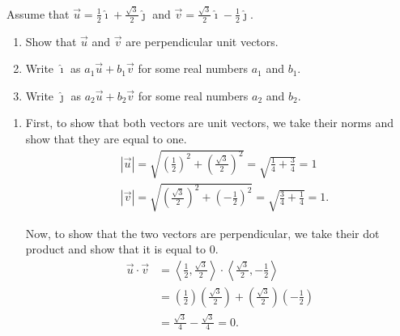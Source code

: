 \documentclass[]{ximera}
\begin{document}
\begin{problem}
Assume that $\vec{u} = \frac{1}{2} \hat{\imath} + \frac{\sqrt{3}}{2} \hat{\jmath}$ and $\vec{v} = \frac{\sqrt{3}}{2} \hat{\imath} - \frac{1}{2} \hat{\jmath}$.
	\begin{enumerate}
	\item  Show that $\vec{u}$ and $\vec{v}$ are perpendicular unit vectors.
	\item  Write $\hat{\imath}$ as $a_1 \vec{u} + b_1 \vec{v}$ for some real numbers $a_1$ and $b_1$.  
	\item  Write $\hat{\jmath}$ as $a_2 \vec{u} + b_2 \vec{v}$ for some real numbers $a_2$ and $b_2$. 
	\end{enumerate}
	
	\begin{freeResponse}
	\begin{enumerate}
	\item  First, to show that both vectors are unit vectors, we take their norms and show that they are equal to one.
		\begin{align*}
		&| \vec{u} | = \sqrt{ \left( \frac{1}{2} \right)^2 + \left( \frac{\sqrt{3}}{2} \right)^2} = \sqrt{ \frac{1}{4} + \frac{3}{4}} = 1  \\
		&| \vec{v} | = \sqrt{ \left( \frac{\sqrt{3}}{2} \right)^2 + \left( - \frac{1}{2} \right)^2} = \sqrt{\frac{3}{4}+\frac{1}{4}} = 1.
		\end{align*}
	
	Now, to show that the two vectors are perpendicular, we take their dot product and show that it is equal to $0$.
		\begin{align*}
		\vec{u} \cdot \vec{v}
		&= \left\langle \frac{1}{2}, \frac{\sqrt{3}}{2} \right\rangle \cdot \left\langle \frac{\sqrt{3}}{2}, - \frac{1}{2} \right\rangle  \\
		&= \left( \frac{1}{2} \right) \left( \frac{\sqrt{3}}{2} \right) + \left( \frac{\sqrt{3}}{2} \right) \left( - \frac{1}{2} \right)  \\
		&= \frac{\sqrt{3}}{4} - \frac{\sqrt{3}}{4} = 0.
		\end{align*}
	
	
	

\end{enumerate}
\end{freeResponse}
\end{problem}
\end{document}
